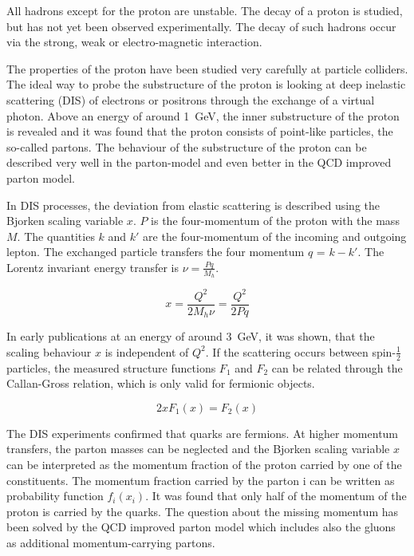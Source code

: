 All hadrons except for the proton are unstable. The decay of a proton is studied, but has not yet been observed experimentally. The decay of such hadrons occur via the strong, weak or electro-magnetic interaction. 

The properties of the proton have been studied very carefully at particle colliders. The ideal way to probe the substructure of the proton is looking at deep inelastic scattering (DIS) of electrons or positrons through the exchange of a virtual photon. Above an energy of around \SI{1}{\giga \electronvolt}, the inner substructure of the proton is revealed and it was found that the proton consists of point-like particles, the so-called partons. The behaviour of the substructure of the proton can be described very well in the parton-model and even better in the QCD improved parton model.
\vspace{\baselineskip}

In DIS processes, the deviation from elastic scattering is described using the Bjorken scaling variable $x$. $P$ is the four-momentum of the proton with the mass $M$. The quantities $k$ and $k'$ are the four-momentum of the incoming and outgoing lepton. The exchanged particle transfers the four momentum $q$ = $k-k'$. The Lorentz invariant energy transfer is $\nu = \frac{Pq}{M_h}$. 

\begin{equation}
x = \frac{Q^2}{2 M_h \nu} = \frac{Q^2}{2 P q}
\end{equation}

In early publications at an energy of around \SI{3}{\giga \electronvolt}, it was shown, that the scaling behaviour $x$ is independent of $Q^2$. If the scattering occurs between spin-$\frac{1}{2}$ particles, the measured structure functions $F_1$ and $F_2$ can be related through the Callan-Gross relation, which is only valid for fermionic objects.

\begin{equation}
2x F_1(x) = F_2 (x)
\end{equation} 

The DIS experiments confirmed that quarks are fermions. At higher momentum transfers, the parton masses can be neglected and the Bjorken scaling variable $x$ can be interpreted as the momentum fraction of the proton carried by one of the constituents. The momentum fraction carried by the parton i can be written as probability function $f_i(x_i)$. It was found that only half of the momentum of the proton is carried by the quarks. The question about the missing momentum has been solved by the QCD improved parton model which includes also the gluons as additional momentum-carrying partons.

